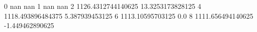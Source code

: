 0 nan nan
1 nan nan
2 1126.4312744140625 13.3253173828125
4 1118.493896484375 5.387939453125
6 1113.10595703125 0.0
8 1111.656494140625 -1.449462890625
